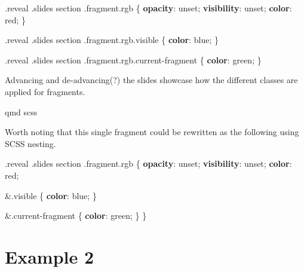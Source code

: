\documentclass[
  letterpaper,
  DIV=11,
  numbers=noendperiod]{scrreprt}
\newenvironment{Shaded}{\begin{snugshade}}{\end{snugshade}}
\newcommand{\BuiltInTok}[1]{\textcolor[rgb]{0.00,0.23,0.31}{#1}}
\newcommand{\ConstantTok}[1]{\textcolor[rgb]{0.56,0.35,0.01}{#1}}
\newcommand{\FunctionTok}[1]{\textcolor[rgb]{0.28,0.35,0.67}{#1}}
\newcommand{\KeywordTok}[1]{\textcolor[rgb]{0.00,0.23,0.31}{\textbf{#1}}}
\newcommand{\NormalTok}[1]{\textcolor[rgb]{0.00,0.23,0.31}{#1}}
\newcommand{\OperatorTok}[1]{\textcolor[rgb]{0.37,0.37,0.37}{#1}}
\begin{document}
\begin{Shaded}
\begin{Highlighting}[]
\FunctionTok{.reveal} \FunctionTok{.slides}\NormalTok{ section }\FunctionTok{.fragment.rgb}\NormalTok{ \{}
  \KeywordTok{opacity}\NormalTok{: }\BuiltInTok{unset}\OperatorTok{;}
  \KeywordTok{visibility}\NormalTok{: }\BuiltInTok{unset}\OperatorTok{;}
  \KeywordTok{color}\NormalTok{: }\ConstantTok{red}\OperatorTok{;}
\NormalTok{\}}

\FunctionTok{.reveal} \FunctionTok{.slides}\NormalTok{ section }\FunctionTok{.fragment.rgb.visible}\NormalTok{ \{}
  \KeywordTok{color}\NormalTok{: }\ConstantTok{blue}\OperatorTok{;}
\NormalTok{\}}

\FunctionTok{.reveal} \FunctionTok{.slides}\NormalTok{ section }\FunctionTok{.fragment.rgb.current{-}fragment}\NormalTok{ \{}
  \KeywordTok{color}\NormalTok{: }\ConstantTok{green}\OperatorTok{;}
\NormalTok{\}}
\end{Highlighting}
\end{Shaded}

Advancing and de-advancing(?) the slides showcase how the different
classes are applied for fragments.

qmd scss

Worth noting that this single fragment could be rewritten as the
following using SCSS nesting.

\begin{Shaded}
\begin{Highlighting}[]
\FunctionTok{.reveal} \FunctionTok{.slides}\NormalTok{ section }\FunctionTok{.fragment.rgb}\NormalTok{ \{}
  \KeywordTok{opacity}\NormalTok{: }\BuiltInTok{unset}\OperatorTok{;}
  \KeywordTok{visibility}\NormalTok{: }\BuiltInTok{unset}\OperatorTok{;}
  \KeywordTok{color}\NormalTok{: }\ConstantTok{red}\OperatorTok{;}

  \OperatorTok{\&}\FunctionTok{.visible}\NormalTok{ \{}
    \KeywordTok{color}\NormalTok{: }\ConstantTok{blue}\OperatorTok{;}
\NormalTok{  \}}

  \OperatorTok{\&}\FunctionTok{.current{-}fragment}\NormalTok{ \{}
    \KeywordTok{color}\NormalTok{: }\ConstantTok{green}\OperatorTok{;}
\NormalTok{  \}}
\NormalTok{\}}
\end{Highlighting}
\end{Shaded}

\section{Example 2}\label{example-2}
\end{document}
